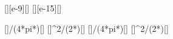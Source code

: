 [\nano\meter][e-9][\m]
[\femto\meter][e-15][\m]

[]{\nchX/(4*pi*\xeX)}[\kgmps]
[]{\peX^2/(2*\ncmeX)}[\joule]
[]{\nchX/(4*pi*\xpX)}[\kgmps]
[]{\ppX^2/(2*\ncmpX)}[\joule]
